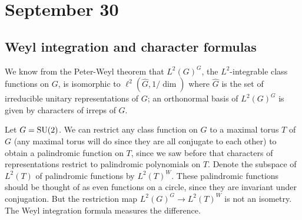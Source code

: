 \documentclass[../../rtnotes.tex]{subfiles}
\begin{document}
\section{September 30}
\subsection{Weyl integration and character formulas}
We know from the Peter-Weyl theorem that $L^2(G)^G$, the $L^2$-integrable class functions on $G$, is isomorphic to $\ell^2(\widehat G,1/\dim)$ where $\widehat G$ is the set of irreducible unitary representations of $G$; an orthonormal basis of $L^2(G)^G$ is given by characters of irreps of $G$.

Let $G=\operatorname{SU}(2)$. We can restrict any class function on $G$ to a maximal torus $T$ of $G$ (any maximal torus will do since they are all conjugate to each other) to obtain a palindromic function on $T$, since we saw before that characters of representations restrict to palindromic polynomials on $T$. Denote the subspace of $L^2(T)$ of palindromic functions by $L^2(T)^W$. These palindromic functions should be thought of as even functions on a circle, since they are invariant under conjugation. But the restriction map $L^2(G)^G\to L^2(T)^W$ is not an isometry. The Weyl integration formula measures the difference.
\end{document}
